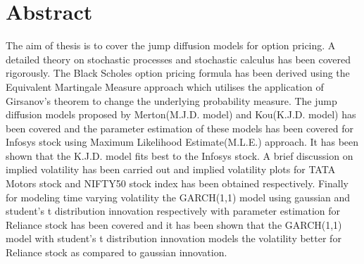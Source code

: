 \documentclass[12pt]{report}
\begin{document}
\newpage


\section*{Abstract}


  

The aim of thesis is to cover the jump diffusion models for option pricing. A detailed theory on stochastic processes and stochastic calculus has been covered rigorously. The Black Scholes option pricing formula has been derived using the  Equivalent Martingale Measure approach which utilises the application of Girsanov's theorem to change the underlying probability measure. The jump diffusion models proposed by Merton(M.J.D. model) and Kou(K.J.D. model) has been covered and the parameter estimation of these models has been covered for Infosys stock using Maximum Likelihood Estimate(M.L.E.) approach. It has been shown that the K.J.D. model fits best to the Infosys stock. A brief discussion on implied volatility has been carried out and implied volatility plots for TATA Motors stock and NIFTY50 stock index has been obtained respectively. Finally for modeling time varying volatility the GARCH(1,1) model using gaussian and student's t distribution innovation respectively with parameter estimation for Reliance stock has been covered and it has been shown that the GARCH(1,1) model with student's t distribution innovation models the volatility better for Reliance stock as compared to gaussian innovation.    

\tableofcontents
\listoffigures
\listoftables
\end{document}
